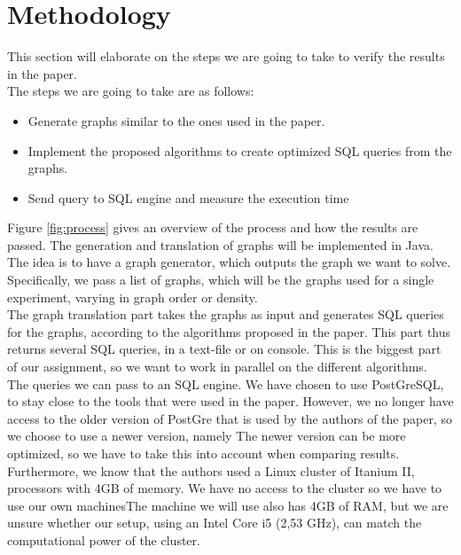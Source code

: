 \section{Methodology}
This section will elaborate on the steps we are going to take to verify the results in the paper.\\

\noindent The steps we are going to take are as follows:

\begin{itemize}
	\item Generate graphs similar to the ones used in the paper.
	\item Implement the proposed algorithms to create optimized SQL queries from the graphs.
	\item Send query to SQL engine and measure the execution time
\end{itemize}

\noindent Figure \ref{fig:process} gives an overview of the process and how the results are passed. The generation and translation of graphs will be implemented in Java. The idea is to have a graph generator, which outputs the graph we want to solve. Specifically, we pass a list of graphs, which will be the graphs used for a single experiment, varying in graph order or density. \\

The graph translation part takes the graphs as input and generates SQL queries for the graphs, according to the algorithms proposed in the paper. This part thus returns several SQL queries, in a text-file or on console. This is the biggest part of our assignment, so we want to work in parallel on the different algorithms. \\

The queries we can pass to an SQL engine. We have chosen to use PostGreSQL, to stay close to the tools that were used in the paper. However, we no longer have access to the older version of PostGre that is used by the authors of the paper, so we choose to use a newer version, namely %
The newer version can be more optimized, so we have to take this into account when comparing results. Furthermore, we know that the authors used a Linux cluster of Itanium II, processors with 4GB of memory. We have no access to the cluster so we have to use our own machinesThe machine we will use also has 4GB of RAM, but we are unsure whether our setup, using an Intel Core i5 (2,53 GHz), can match the computational power of the cluster.

